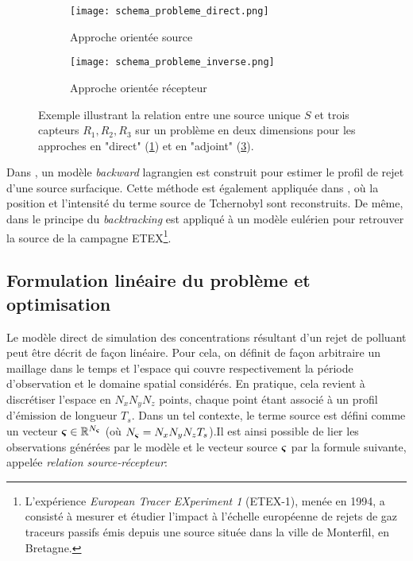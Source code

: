  \begin{figure}[h]
 	\begin{subfigure}{0.5\textwidth}
 		\texttt{[image: schema\_probleme\_direct.png]}
 		\caption{Approche orientée source}
 		\label{schema_probleme_direct}
 	\end{subfigure}
 	\begin{subfigure}{0.5\textwidth}
 		\texttt{[image: schema\_probleme\_inverse.png]}
 		\caption{Approche orientée récepteur}
 		\label{schema_probleme_inverse}
 	\end{subfigure}
 	\caption{Exemple illustrant la relation entre une source unique $S$ et trois capteurs $R_1,R_2,R_3$ sur un problème en deux dimensions pour les approches en "direct" (\ref{schema_probleme_direct}) et en "adjoint" (\ref{schema_probleme_inverse}). }
 \end{figure}
 
 Dans \cite{Flesch1995}, un modèle \textit{backward} lagrangien est construit pour estimer le profil de rejet d'une source surfacique.  Cette méthode est également appliquée dans \cite{Pudykiewicz1998}, où la position et l'intensité du terme source de Tchernobyl sont reconstruits. De même, dans \cite{Hourdin2006b} le principe du \textit{backtracking} est appliqué à un modèle eulérien pour retrouver la source de la campagne ETEX\footnote{L’expérience \textit{European Tracer EXperiment 1} (ETEX-1), menée en 1994,  a consisté à mesurer et étudier l'impact à l'échelle européenne de rejets de gaz traceurs passifs émis depuis une source située dans la ville de Monterfil, en Bretagne.}.\\
 
 \subsection{Formulation linéaire du problème et optimisation}
 \label{subsection_MCO}
 
Le modèle direct de simulation des concentrations résultant d'un rejet de polluant peut être décrit de façon linéaire. Pour cela, on définit de façon arbitraire un maillage dans le temps et l'espace qui couvre respectivement la période d'observation et le domaine spatial considérés. En pratique, cela revient à discrétiser l'espace en $N_xN_yN_z$ points, chaque point étant associé à un profil d'émission de longueur $T_s$. Dans un tel contexte, le terme source est défini comme un vecteur ${\bm{\varsigma}} \in \mathbb{R}^{N_{\bm{\varsigma}}}$ (où $N_{\bm{\varsigma}} = N_xN_yN_zT_s$).Il est ainsi possible de lier les observations générées par le modèle et le vecteur source ${\bm{\varsigma}}$ par la formule suivante, appelée \textit{relation source-récepteur}:

